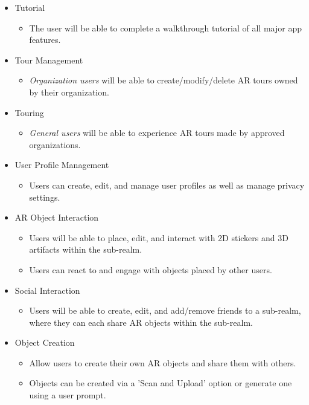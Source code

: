 \documentclass{article}
\begin{document}
\begin{itemize}
    \item Tutorial
          \begin{itemize}
              \item The user will be able to complete a walkthrough tutorial of all major app features.
          \end{itemize}

    \item Tour Management
          \begin{itemize}
              \item \textit{Organization users} will be able to create/modify/delete AR tours owned by their organization.
          \end{itemize}

    \item Touring
          \begin{itemize}
              \item \textit{General users} will be able to experience AR tours made by approved organizations.
          \end{itemize}

    \item User Profile Management
          \begin{itemize}
              \item Users can create, edit, and manage user profiles as well as manage privacy settings.
          \end{itemize}

    \item AR Object Interaction
          \begin{itemize}
              \item Users will be able to place, edit, and interact with 2D stickers and 3D artifacts within the sub-realm.
              \item Users can react to and engage with objects placed by other users.
          \end{itemize}

    \item Social Interaction
          \begin{itemize}
              \item Users will be able to create, edit, and add/remove friends to a sub-realm, where they can each share AR objects within the sub-realm.
          \end{itemize}

    \item Object Creation
          \begin{itemize}
              \item Allow users to create their own AR objects and share them with others.
              \item Objects can be created via a 'Scan and Upload' option or generate one using a user prompt.
          \end{itemize}


\end{itemize}
\end{document}
